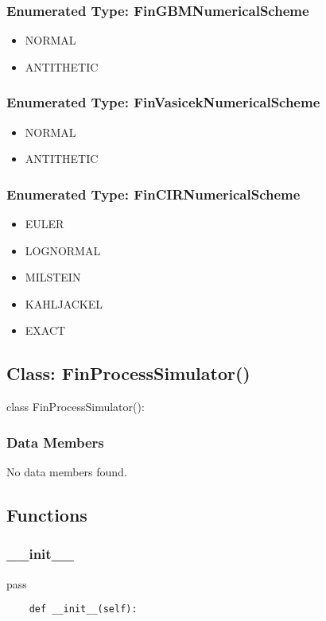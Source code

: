 \documentclass[twoside,11pt]{book}
\begin{document}
\subsubsection{Enumerated Type: FinGBMNumericalScheme}
\begin{itemize}
\item{NORMAL}
\item{ANTITHETIC}
\end{itemize}

\subsubsection{Enumerated Type: FinVasicekNumericalScheme}
\begin{itemize}
\item{NORMAL}
\item{ANTITHETIC}
\end{itemize}

\subsubsection{Enumerated Type: FinCIRNumericalScheme}
\begin{itemize}
\item{EULER}
\item{LOGNORMAL}
\item{MILSTEIN}
\item{KAHLJACKEL}
\item{EXACT}
\end{itemize}

\subsection*{Class: FinProcessSimulator()}
class FinProcessSimulator(): 

\subsubsection*{Data Members}
No data members found.

\subsection*{Functions}

\subsubsection*{{\bf \_\_init\_\_}}
pass 

\begin{lstlisting}
    def __init__(self):
\end{lstlisting}
\end{document}
